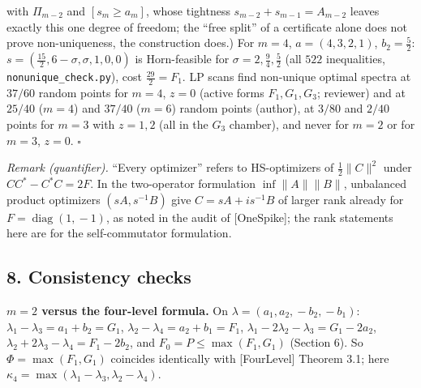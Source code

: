 \documentclass[
  11pt,
  a4paper,
]{article}
\begin{document}
with \(\Pi_{m-2}\) and \([s_m\ge a_m]\), whose tightness
\(s_{m-2}+s_{m-1}=A_{m-2}\) leaves exactly this one degree of freedom;
the ``free split'' of a certificate alone does not prove non-uniqueness,
the construction does.) For \(m=4\), \(a=(4,\allowbreak{}3,\allowbreak{}2,\allowbreak{}1)\), \(b_2=\tfrac52\):
\(s=(\tfrac{15}2,\allowbreak{}6-\sigma,\allowbreak{}\sigma,\allowbreak{}1,\allowbreak{}0,\allowbreak{}0)\) is Horn-feasible for
\(\sigma=2,\allowbreak{}\tfrac94,\allowbreak{}\tfrac52\) (all \(522\) inequalities,
{\small\texttt{nonunique\_\allowbreak{}check.\allowbreak{}py}}), cost \(\tfrac{29}2=F_1\). LP scans find
non-unique optimal spectra at \(37/60\) random points for \(m=4\),
\(z=0\) (active forms \(F_1,\allowbreak{}G_1,\allowbreak{}G_3\); reviewer) and at \(25/40\)
(\(m=4\)) and \(37/40\) (\(m=6\)) random points (author), at \(3/80\)
and \(2/40\) points for \(m=3\) with \(z=1,\allowbreak{}2\) (all in the \(G_3\)
chamber), and never for \(m=2\) or for \(m=3\), \(z=0\). \(\square\)

\emph{Remark (quantifier).} ``Every optimizer'' refers to HS-optimizers
of \(\tfrac12\|C\|^2\) under \(CC^*-C^*C=2F\). In the two-operator
formulation \(\inf\|A\|\|B\|\), unbalanced product optimizers
\((sA,\allowbreak{}s^{-1}B)\) give \(C=sA+is^{-1}B\) of larger rank already for
\(F=\operatorname{diag}(1,\allowbreak{}-1)\), as noted in the audit of
{[}OneSpike{]}; the rank statements here are for the self-commutator
formulation.

\subsection{8. Consistency checks}\label{consistency-checks}

\textbf{\(m=2\) versus the four-level formula.} On
\(\lambda=(a_1,\allowbreak{}a_2,\allowbreak{}-b_2,\allowbreak{}-b_1)\): \(\lambda_1-\lambda_3=a_1+b_2=G_1\),
\(\lambda_2-\lambda_4=a_2+b_1=F_1\),
\(\lambda_1-2\lambda_2-\lambda_3=G_1-2a_2\),
\(\lambda_2+2\lambda_3-\lambda_4=F_1-2b_2\), and
\(F_0=P\le\max(F_1,\allowbreak{}G_1)\) (Section 6). So \(\Phi=\max(F_1,\allowbreak{}G_1)\)
coincides identically with {[}FourLevel{]} Theorem 3.1; here
\(\kappa_4=\max(\lambda_1-\lambda_3,\allowbreak{}\lambda_2-\lambda_4)\).
\end{document}

